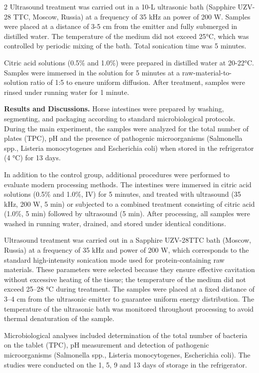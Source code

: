 \begin{multicols}{2}
Ultrasound treatment was carried out in a 10-L ultrasonic bath (Sapphire
UZV-28 TTC, Moscow, Russia) at a frequency of 35 kHz an power of 200 W.
Samples were placed at a distance of 3-5 cm from the emitter and fully
submerged in distilled water. The temperature of the medium did not
exceed 25°C, which was controlled by periodic mixing of the bath. Total
sonication time was 5 minutes.

Citric acid solutions (0.5\% and 1.0\%) were prepared in distilled water
at 20-22°C. Samples were immersed in the solution for 5 minutes at a
raw-material-to-solution ratio of 1:5 to ensure uniform diffusion. After
treatment, samples were rinsed under running water for 1 minute.

{\bfseries Results and Discussions.} Horse intestines were prepared by
washing, segmenting, and packaging according to standard microbiological
protocols. During the main experiment, the samples were analyzed for the
total number of plates (TPC), pH and the presence of pathogenic
microorganisms (Salmonella spp., Listeria monocytogenes and Escherichia
coli) when stored in the refrigerator (4 °C) for 13 days.

In addition to the control group, additional procedures were performed
to evaluate modern processing methods. The intestines were immersed in
citric acid solutions (0.5\% and 1.0\%, IV) for 5 minutes, and treated
with ultrasound (35 kHz, 200 W, 5 min) or subjected to a combined
treatment consisting of citric acid (1.0\%, 5 min) followed by
ultrasound (5 min). After processing, all samples were washed in running
water, drained, and stored under identical conditions.

Ultrasound treatment was carried out in a Sapphire UZV-28TTC bath
(Moscow, Russia) at a frequency of 35 kHz and power of 200 W, which
corresponds to the standard high-intensity sonication mode used for
protein-containing raw materials. These parameters were selected because
they ensure effective cavitation without excessive heating of the
tissue; the temperature of the medium did not exceed 25--28 °C during
treatment. The samples were placed at a fixed distance of 3--4 cm from
the ultrasonic emitter to guarantee uniform energy distribution. The
temperature of the ultrasonic bath was monitored throughout processing
to avoid thermal denaturation of the sample.

Microbiological analyses included determination of the total number of
bacteria on the tablet (TPC), pH measurement and detection of pathogenic
microorganisms (Salmonella spp., Listeria monocytogenes, Escherichia
coli). The studies were conducted on the 1,
5, 9 and 13
days of storage in the refrigerator.


\end{multicols}
